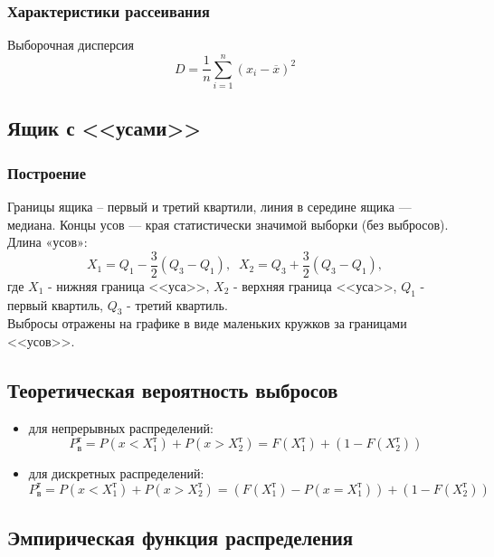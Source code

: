 \documentclass[a4paper]{article}
\begin{document}
\subsubsection{Характеристики рассеивания}
Выборочная дисперсия
\begin{equation}\label{svar}
    D=\frac{1}{n}\sum_{i=1}^n \left(x_i-\overline{x}\right)^2
\end{equation}
\subsection{Ящик с <<усами>>}
\subsubsection{Построение}
Границы ящика – первый и третий квартили, линия в середине ящика — медиана. Концы усов — края статистически значимой выборки (без выбросов). Длина «усов»:
\begin{equation}\label{whiskers}
    X_1 = Q_1 - \frac{3}{2}\left(Q_3-Q_1\right),\;\;X_2 = Q_3 + \frac{3}{2}\left(Q_3-Q_1\right),
\end{equation}
где $X_1$ - нижняя граница <<уса>>, $X_2$ - верхняя граница <<уса>>, $Q_1$ - первый квартиль, $Q_3$ - третий квартиль.\\
Выбросы отражены на графике в виде маленьких кружков за границами <<усов>>.
\subsection{Теоретическая вероятность выбросов}
\begin{itemize}
    \item для непрерывных распределений:
    \begin{equation}\label{abscontprob}
        P^{\text{т}}_{\text{в}} = P\left(x<X_1^{\text{т}}\right)+P\left(x>X_2^{\text{т}}\right)=F\left(X_1^{\text{т}}\right) + \left(1-F\left(X_2^{\text{т}}\right)\right)
    \end{equation}
    \item для дискретных распределений:
    \begin{equation}\label{discrprob}
        P^{\text{т}}_{\text{в}} = P\left(x<X_1^{\text{т}}\right)+P\left(x>X_2^{\text{т}}\right)=\left(F\left(X_1^{\text{т}}\right)-P\left(x=X_1^{\text{т}}\right)\right) + \left(1-F\left(X_2^{\text{т}}\right)\right)
    \end{equation}
\end{itemize}
\subsection{Эмпирическая функция распределения}
\end{document}
